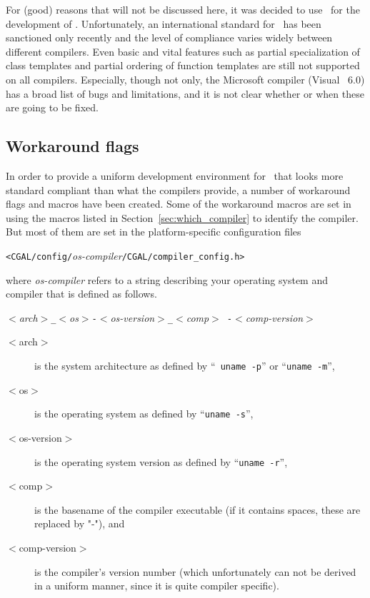 For (good) reasons that will not be discussed here, it was decided to
use \CC\ for the development of \cgal. Unfortunately, an international
standard for \CC\ has been sanctioned only recently
\cite{cgal:ansi-is14882-98} and the level of compliance varies widely
between different compilers. 
Even basic and vital features such as
partial specialization of class templates and partial ordering of
function templates are still not supported on all compilers.
Especially, though not only, the Microsoft compiler (Visual \CC\ 6.0)
has a broad list of bugs and limitations, and it is not clear whether
or when these are going to be fixed.

\subsection{Workaround flags}
\label{sec:workaround_flags}

In order to provide a uniform development environment for \cgal\ that
looks more standard compliant than what the compilers provide, a number
of workaround flags and macros have been created.  Some of the
workaround macros are set in 
using the macros 
listed in Section~\ref{sec:which_compiler} to identify the compiler. 
But most of them are set in the platform-specific configuration files
\begin{center}
\texttt{<CGAL/config/}{\em os-compiler}\texttt{/CGAL/compiler\_config.h>}
\end{center}
where \textit{os-compiler} refers to a string describing your
operating system and compiler that is defined as follows.

\begin{center}
  \textit{$<$arch$>$\texttt{\_}$<$os$>$\texttt{-}$<$os-version$>$\texttt{\_}$<$comp$>${\tt
      -}$<$comp-version$>$}
\end{center}

\begin{description}
\item[$<$arch$>$] is the system architecture as defined by ``{\tt
    uname -p}'' or ``\texttt{uname -m}'',
\item[$<$os$>$] is the operating system as defined by ``\texttt{uname
    -s}'',
\item[$<$os-version$>$] is the operating system version as defined by
  ``\texttt{uname -r}'',
\item[$<$comp$>$] is the basename of the compiler executable (if it
  contains spaces, these are replaced by "-"), and
\item[$<$comp-version$>$] is the compiler's version number (which
  unfortunately can not be derived in a uniform manner, since it is
  quite compiler specific).
\end{description}

